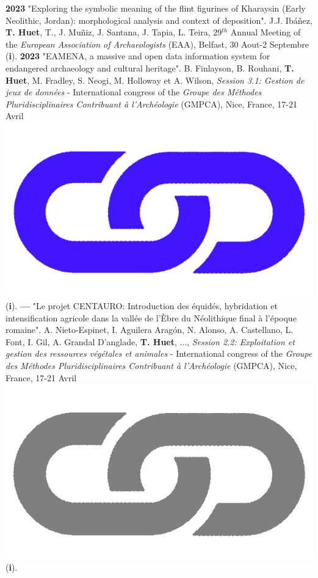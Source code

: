 \documentclass{article}
\begin{document}
\smallbreak
\textbf{2023 }"Exploring the symbolic meaning of the flint figurines of Kharaysin (Early Neolithic, Jordan): morphological analysis and context of deposition". J.J. Ibáñez, \textbf{T. Huet}, T., J. Muñiz, J. Santana, J. Tapia, L. Teira, 29${}^{th}$ Annual Meeting of the \textit{European Association of Archaeologists} (EAA), Belfast, 30 Aout-2 Septembre (\textbf{i}).
\smallbreak
\textbf{2023 }"EAMENA, a massive and open data information system for endangered archaeology and cultural heritage". B. Finlayson, B. Rouhani, \textbf{T. Huet}, M. Fradley, S. Neogi, M. Holloway et A. Wilson, \textit{Session 3.1: Gestion de jeux de données} - International congress of the \textit{Groupe des Méthodes Pluridisciplinaires Contribuant à l'Archéologie} (GMPCA), Nice, France, 17-21 Avril \href{https://eamena-project.github.io/eamena-arches-dev/talks/2023-gmpca/pres/#/title-slide}{\includegraphics[scale=0.02]{link_darkblue.png}} (\textbf{i}).
\smallbreak
\textbf{--- }"Le projet CENTAURO: Introduction des équidés, hybridation et intensification agricole dans la vallée de l'Èbre du Néolithique final à l'époque romaine". A. Nieto-Espinet, I. Aguilera Aragón, N. Alonso, A. Castellano, L. Font, I. Gil, A. Grandal D'anglade, \textbf{T. Huet}, ..., \textit{Session 2.2: Exploitation et gestion des ressources végétales et animales} - International congress of the \textit{Groupe des Méthodes Pluridisciplinaires Contribuant à l'Archéologie} (GMPCA), Nice, France, 17-21 Avril \href{https://gmpca2023.sciencesconf.org/}{\includegraphics[scale=0.02]{link_grey.png}} (\textbf{i}).
\end{document}
